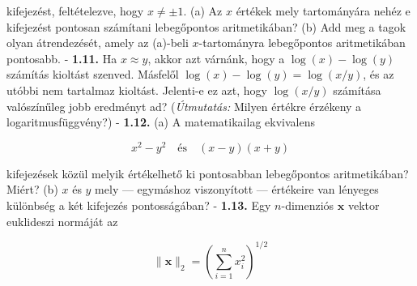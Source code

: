 \documentclass[
  magyar,
  11pt]{article}
\providecommand{\boldsymbol}[1]{\mathbf{#1}}
\begin{document}
kifejezést, feltételezve, hogy \(x \neq \pm 1\). (a) Az \(x\) értékek
mely tartományára nehéz e kifejezést pontosan számítani lebegőpontos
aritmetikában? (b) Add meg a tagok olyan átrendezését, amely az (a)-beli
\(x\)-tartományra lebegőpontos aritmetikában pontosabb. - \textbf{1.11.}
Ha \(x \approx y\), akkor azt várnánk, hogy a \(\log(x) - \log(y)\)
számítás kioltást szenved. Másfelől \(\log(x) - \log(y) = \log(x/y)\),
és az utóbbi nem tartalmaz kioltást. Jelenti-e ez azt, hogy
\(\log(x/y)\) számítása valószínűleg jobb eredményt ad?
(\emph{Útmutatás:} Milyen értékre érzékeny a logaritmusfüggvény?) -
\textbf{1.12.} (a) A matematikailag ekvivalens

\[x^2 - y^2 \quad \text{és} \quad (x - y)(x + y)\]

kifejezések közül melyik értékelhető ki pontosabban lebegőpontos
aritmetikában? Miért? (b) \(x\) és \(y\) mely --- egymáshoz viszonyított
--- értékeire van lényeges különbség a két kifejezés pontosságában? -
\textbf{1.13.} Egy \(n\)-dimenziós \(\boldsymbol{x}\) vektor euklideszi
normáját az

\[\|\boldsymbol{x}\|_2 = \left(\sum_{i=1}^n x_i^2\right)^{1/2}\]
\end{document}
